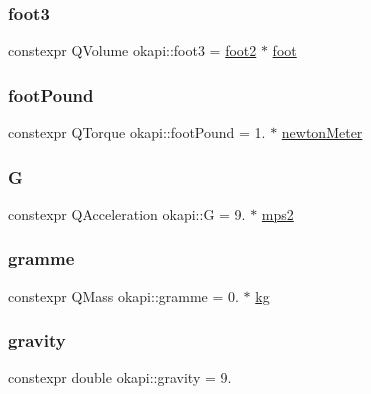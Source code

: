 \subsubsection{\texorpdfstring{foot3}{foot3}}
{\footnotesize\ttfamily constexpr Q\+Volume okapi\+::foot3 = \mbox{\hyperlink{namespaceokapi_a30332192fb24d5d1f81883969ec4878a}{foot2}} $\ast$ \mbox{\hyperlink{namespaceokapi_a76974d5bf7ed9473b2d59153894a8587}{foot}}}

\mbox{\label{namespaceokapi_a2312145f0a7f17b0a275289bfd369308}} 
\subsubsection{\texorpdfstring{footPound}{footPound}}
{\footnotesize\ttfamily constexpr Q\+Torque okapi\+::foot\+Pound = 1. $\ast$ \mbox{\hyperlink{namespaceokapi_a3d685da47b39ff4bdf1936c2e12076ee}{newton\+Meter}}}

\mbox{\label{namespaceokapi_a6e00ff72f863a56a3fc99ca94f106a5a}} 
\subsubsection{\texorpdfstring{G}{G}}
{\footnotesize\ttfamily constexpr Q\+Acceleration okapi\+::G = 9. $\ast$ \mbox{\hyperlink{namespaceokapi_a87ed91f18439f9e7e29392272f329f1c}{mps2}}}

\mbox{\label{namespaceokapi_a494f6de7e44c5a31663ff887d5dc73fb}} 
\subsubsection{\texorpdfstring{gramme}{gramme}}
{\footnotesize\ttfamily constexpr Q\+Mass okapi\+::gramme = 0. $\ast$ \mbox{\hyperlink{namespaceokapi_afcc67eb55c70e21f82cbee49aa19d05a}{kg}}}

\mbox{\label{namespaceokapi_a35009d9782cfcf5a519ff7d8fc39f86f}} 
\subsubsection{\texorpdfstring{gravity}{gravity}}
{\footnotesize\ttfamily constexpr double okapi\+::gravity = 9.\hspace{0.3cm}{\ttfamily [static]}}

